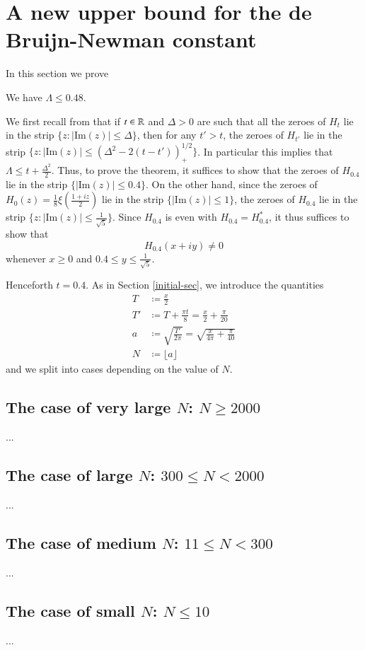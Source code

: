 \section{A new upper bound for the de Bruijn-Newman constant}

In this section we prove

\begin{theorem}  We have $\Lambda \leq 0.48$.
\end{theorem}

We first recall from \cite[Theorem 13]{debr} that if $t \in \mathbb{R}$ and $\Delta>0$ are such that all the zeroes of $H_t$ lie in the strip $\{ z: |\mathrm{Im}(z)| \leq \Delta \}$, then for any $t' > t$, the zeroes of $H_{t'}$ lie in the strip $\{ z: |\mathrm{Im}(z)| \leq (\Delta^2 - 2(t-t'))_+^{1/2} \}$. In particular this implies that $\Lambda \leq t + \frac{\Delta^2}{2}$.  Thus, to prove the theorem, it suffices to show that the zeroes of $H_{0.4}$ lie in the strip $\{ |\mathrm{Im}(z)| \leq 0.4 \}$.  On the other hand, since the zeroes of $H_0(z) = \frac{1}{8} \xi\left(\frac{1+iz}{2}\right)$ lie in the strip $\{ |\mathrm{Im}(z)| \leq 1 \}$, the zeroes of $H_{0.4}$ lie in the strip $\{ z: |\mathrm{Im}(z)| \leq \frac{1}{\sqrt{5}}\}$.  Since $H_{0.4}$ is even with $H_{0.4} = H_{0.4}^*$, it thus suffices to show that
$$ H_{0.4}(x+iy) \neq 0$$
whenever $x \geq 0$ and $0.4 \leq y \leq \frac{1}{\sqrt{5}}$.

Henceforth $t=0.4$.  As in Section \ref{initial-sec}, we introduce the quantities
\begin{align*}
T &\coloneqq \frac{x}{2}\\
T' &\coloneqq T + \frac{\pi t}{8} = \frac{x}{2} + \frac{\pi}{20} \\
a &\coloneqq \sqrt{\frac{T'}{2\pi}} = \sqrt{\frac{x}{4\pi} + \frac{\pi}{40}}\\
N &\coloneqq \lfloor a \rfloor
\end{align*}
and we split into cases depending on the value of $N$.


\subsection{The case of very large $N$: $N \geq 2000$}

...

\subsection{The case of large $N$: $300 \leq N < 2000$}

...

\subsection{The case of medium $N$: $11 \leq N < 300$}

...

\subsection{The case of small $N$: $N \leq 10$}

...



